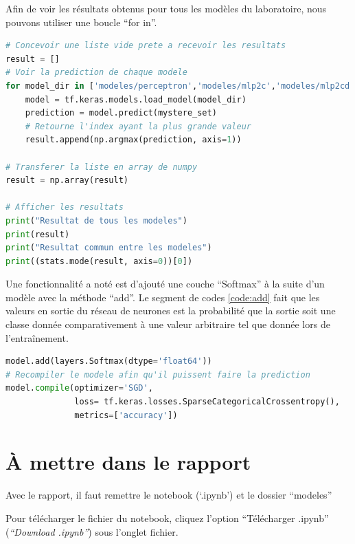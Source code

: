 \documentclass{article}
\begin{document}
Afin de voir les résultats obtenus pour tous les modèles du laboratoire, nous pouvons utiliser une boucle ``for in''.

\begin{lstlisting}[language=Python, caption={Prédire le résultat des données avec tous les modèles}, label={code:predict}]
# Concevoir une liste vide prete a recevoir les resultats
result = []
# Voir la prediction de chaque modele
for model_dir in ['modeles/perceptron','modeles/mlp2c','modeles/mlp2cd','modeles/mlp3c']:
    model = tf.keras.models.load_model(model_dir)
    prediction = model.predict(mystere_set)
    # Retourne l'index ayant la plus grande valeur
    result.append(np.argmax(prediction, axis=1))

# Transferer la liste en array de numpy
result = np.array(result)

# Afficher les resultats
print("Resultat de tous les modeles")
print(result)
print("Resultat commun entre les modeles")
print((stats.mode(result, axis=0))[0])
\end{lstlisting}

Une fonctionnalité a noté est d'ajouté une couche ``Softmax'' à la suite d'un modèle avec la méthode ``add''. Le segment de codes \ref{code:add} fait que les valeurs en sortie du réseau de neurones est la probabilité que la sortie soit une classe donnée comparativement à une valeur arbitraire tel que donnée lors de l'entraînement.
\medbreak
\begin{lstlisting}[language=Python, caption={Utilisation de la méthode ``add''}, label={code:add}]
model.add(layers.Softmax(dtype='float64'))
# Recompiler le modele afin qu'il puissent faire la prediction
model.compile(optimizer='SGD',
              loss= tf.keras.losses.SparseCategoricalCrossentropy(),
              metrics=['accuracy'])
\end{lstlisting}

\section{À mettre dans le rapport} %
Avec le rapport, il faut remettre le notebook (`.ipynb') et le dossier ``modeles''
\medbreak

Pour télécharger le fichier du notebook, cliquez l'option ``Télécharger .ipynb'' (\textit{``Download .ipynb''}) sous l'onglet fichier.
\end{document}
